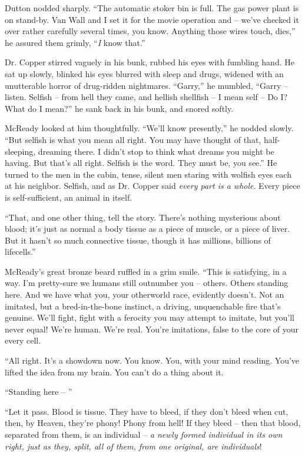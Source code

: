 \documentclass[letterpaper,openany,12pt]{memoir}		%
\begin{document}
Dutton nodded sharply. ``The automatic stoker bin is full. The gas power plant
is on stand-by. Van Wall and I set it for the movie operation and -- we've
checked it over rather carefully several times, you know. Anything those wires
touch, dies,'' he assured them grimly, ``\emph{I} know that.''

Dr. Copper stirred vaguely in his bunk, rubbed his eyes with fumbling hand. He
sat up slowly, blinked his eyes blurred with sleep and drugs, widened with an
unutterable horror of drug-ridden nightmares. ``Garry,'' he mumbled, ``Garry --
listen. Selfish -- from hell they came, and hellish shellfish -- I mean self -- Do
I? What do I mean?'' he sank back in his bunk, and snored softly.

McReady looked at him thoughtfully. ``We'll know presently,'' he nodded slowly.
``But selfish is what you mean all right. You may have thought of that,
half-sleeping, dreaming there. I didn't stop to think what dreams you might be
having. But that's all right. Selfish is the word. They must be, you see.'' He
turned to the men in the cabin, tense, silent men staring with wolfish eyes each
at his neighbor. Selfish, and as Dr. Copper said \emph{every part is a whole}.
Every piece is self-sufficient, an animal in itself.

``That, and one other thing, tell the story. There's nothing mysterious about
blood; it's just as normal a body tissue as a piece of muscle, or a piece of
liver. But it hasn't so much connective tissue, though it has millions, billions
of lifecells.''

McReady's great bronze beard ruffled in a grim smile. ``This is satisfying, in a
way. I'm pretty-sure we humans still outnumber you -- others. Others standing
here. And we have what you, your otherworld race, evidently doesn't. Not an
imitated, but a bred-in-the-bone instinct, a driving, unquenchable fire that's
genuine. We'll fight, fight with a ferocity you may attempt to imitate, but
you'll never equal! We're human. We're real. You're imitations, false to the
core of your every cell.

``All right. It's a showdown now. You know. You, with your mind reading. You've
lifted the idea from my brain. You can't do a thing about it.

``Standing here -- ''

``Let it pass. Blood is tissue. They have to bleed, if they don't bleed when
cut, then, by Heaven, they're phony! Phony from hell! If they bleed -- then that
blood, separated from them, is an individual -- \emph{a newly formed individual
in its own right, just as they, split, all of them, from one original, are
individuals}!
\end{document}
